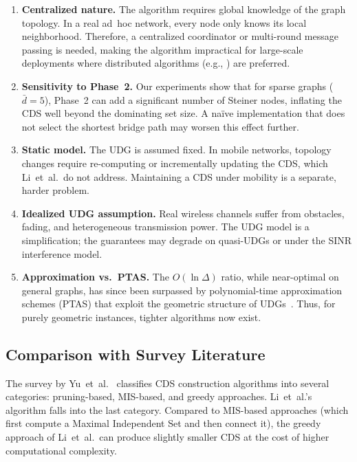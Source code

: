 \documentclass[11pt,a4paper]{article}
\begin{document}
\begin{enumerate}[nosep]
  \item \textbf{Centralized nature.} The algorithm requires global knowledge
        of the graph topology.  In a real ad~hoc network, every node only
        knows its local neighborhood.  Therefore, a centralized coordinator or
        multi-round message passing is needed, making the algorithm impractical
        for large-scale deployments where distributed algorithms
        (e.g., \cite{wan2002}) are preferred.
  \item \textbf{Sensitivity to Phase~2.} Our experiments show that for sparse
        graphs ($\bar{d} = 5$), Phase~2 can add a significant number of
        Steiner nodes, inflating the CDS well beyond the dominating set size.
        A na\"ive implementation that does not select the shortest bridge
        path may worsen this effect further.
  \item \textbf{Static model.} The UDG is assumed fixed.  In mobile
        networks, topology changes require re-computing or incrementally
        updating the CDS, which Li~et~al.\ do not address.  Maintaining a
        CDS under mobility is a separate, harder problem.
  \item \textbf{Idealized UDG assumption.} Real wireless channels suffer
        from obstacles, fading, and heterogeneous transmission power.  The
        UDG model is a simplification; the guarantees may degrade on
        quasi-UDGs or under the SINR interference model.
  \item \textbf{Approximation vs.\ PTAS.} The $O(\ln \Delta)$ ratio,
        while near-optimal on general graphs, has since been surpassed by
        polynomial-time approximation schemes (PTAS) that exploit the
        geometric structure of UDGs~\cite{yu2013}.  Thus, for purely
        geometric instances, tighter algorithms now exist.
\end{enumerate}

\subsection{Comparison with Survey Literature}

The survey by Yu~et~al.~\cite{yu2013} classifies CDS construction algorithms
into several categories: pruning-based, MIS-based, and greedy approaches.
Li~et~al.'s algorithm falls into the last category.  Compared to MIS-based
approaches (which first compute a Maximal Independent Set and then connect it),
the greedy approach of Li~et~al.\ can produce slightly smaller CDS at the cost
of higher computational complexity.
\end{document}
